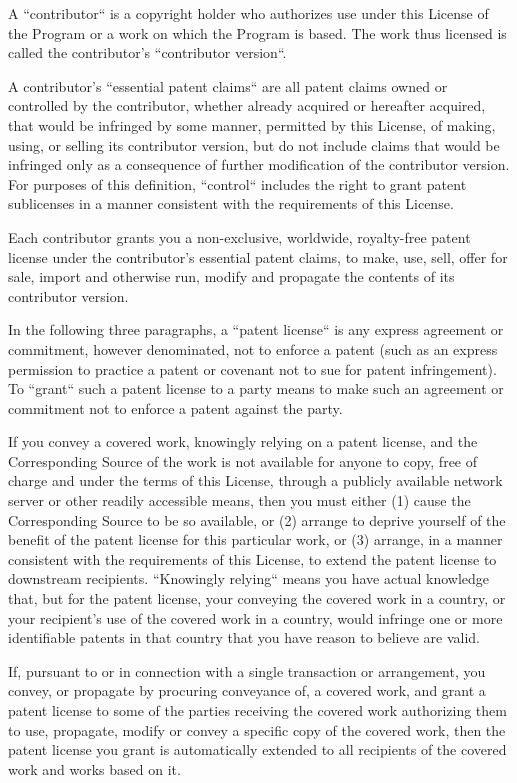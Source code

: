 \documentclass[a4paper, 11pt, twoside]{article}
\begin{document}
A “contributor“ is a copyright holder who authorizes use under this License of the Program or a work on which the Program is based. The work thus licensed is called the contributor's “contributor version“.

A contributor's “essential patent claims“ are all patent claims owned or controlled by the contributor, whether already acquired or hereafter acquired, that would be infringed by some manner, permitted by this License, of making, using, or selling its contributor version, but do not include claims that would be infringed only as a consequence of further modification of the contributor version. For purposes of this definition, “control“ includes the right to grant patent sublicenses in a manner consistent with the requirements of this License.

Each contributor grants you a non-exclusive, worldwide, royalty-free patent license under the contributor's essential patent claims, to make, use, sell, offer for sale, import and otherwise run, modify and propagate the contents of its contributor version.

In the following three paragraphs, a “patent license“ is any express agreement or commitment, however denominated, not to enforce a patent (such as an express permission to practice a patent or covenant not to sue for patent infringement). To “grant“ such a patent license to a party means to make such an agreement or commitment not to enforce a patent against the party.

If you convey a covered work, knowingly relying on a patent license, and the Corresponding Source of the work is not available for anyone to copy, free of charge and under the terms of this License, through a publicly available network server or other readily accessible means, then you must either (1) cause the Corresponding Source to be so available, or (2) arrange to deprive yourself of the benefit of the patent license for this particular work, or (3) arrange, in a manner consistent with the requirements of this License, to extend the patent license to downstream recipients. “Knowingly relying“ means you have actual knowledge that, but for the patent license, your conveying the covered work in a country, or your recipient's use of the covered work in a country, would infringe one or more identifiable patents in that country that you have reason to believe are valid.

If, pursuant to or in connection with a single transaction or arrangement, you convey, or propagate by procuring conveyance of, a covered work, and grant a patent license to some of the parties receiving the covered work authorizing them to use, propagate, modify or convey a specific copy of the covered work, then the patent license you grant is automatically extended to all recipients of the covered work and works based on it.
\end{document}
